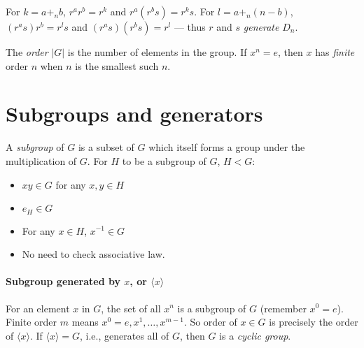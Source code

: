 \documentclass[a4paper,twocolumn,10pt]{article}
\begin{document}
  For $k=a+_nb$, $r^ar^b=r^k$ and $r^a(r^bs)=r^ks$.  For $l=a+_n(n-b)$,
  $(r^as)r^b=r^ls$ and $(r^as)(r^bs)=r^l$ --- thus $r$ and $s$
  \textit{generate} $D_n$.

  The \textit{order} $|G|$ is the number of elements in the group. If $x^n=e$,
  then $x$ has \textit{finite} order $n$ when $n$ is the smallest such $n$.

  \section{Subgroups and generators}
  A \textit{subgroup} of $G$ is a subset of $G$ which itself forms a group
  under the multiplication of $G$. For $H$ to be a subgroup of $G$, $H<G$:
  \begin{itemize}
    \item $xy \in G$ for any $x,y \in H$
    \item $e_H \in G$
    \item For any $x \in H$, $x^{-1} \in G$
    \item No need to check associative law.
  \end{itemize}

  \paragraph{Subgroup generated by $x$, or $\langle x \rangle$}
  For an element $x$ in $G$, the set of all $x^n$ is a subgroup of $G$
  (remember $x^0=e$). Finite order $m$ means $x^0=e, x^1, \ldots, x^{m-1}$.
  So order of $x\in G$ is precisely the order of $\langle x\rangle$. If
  $\langle x\rangle=G$, i.e., generates all of $G$, then $G$ is a
  \textit{cyclic group}.
\end{document}
